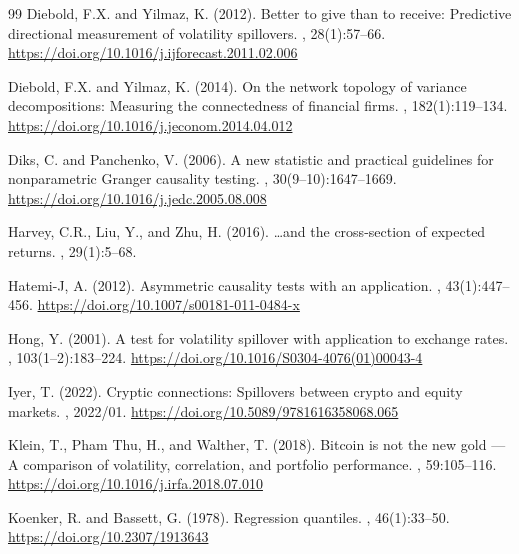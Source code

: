 \documentclass[11pt,a4paper]{article}
\begin{document}
\begin{thebibliography}{99}
Diebold, F.X. and Yilmaz, K. (2012).
\newblock Better to give than to receive: Predictive directional measurement of volatility spillovers.
, 28(1):57--66.
\newblock \url{https://doi.org/10.1016/j.ijforecast.2011.02.006}

Diebold, F.X. and Yilmaz, K. (2014).
\newblock On the network topology of variance decompositions: Measuring the connectedness of financial firms.
, 182(1):119--134.
\newblock \url{https://doi.org/10.1016/j.jeconom.2014.04.012}

Diks, C. and Panchenko, V. (2006).
\newblock A new statistic and practical guidelines for nonparametric Granger causality testing.
, 30(9--10):1647--1669.
\newblock \url{https://doi.org/10.1016/j.jedc.2005.08.008}

Harvey, C.R., Liu, Y., and Zhu, H. (2016).
\newblock \ldots and the cross-section of expected returns.
, 29(1):5--68.

Hatemi-J, A. (2012).
\newblock Asymmetric causality tests with an application.
, 43(1):447--456.
\newblock \url{https://doi.org/10.1007/s00181-011-0484-x}

Hong, Y. (2001).
\newblock A test for volatility spillover with application to exchange rates.
, 103(1--2):183--224.
\newblock \url{https://doi.org/10.1016/S0304-4076(01)00043-4}

Iyer, T. (2022).
\newblock Cryptic connections: Spillovers between crypto and equity markets.
, 2022/01.
\newblock \url{https://doi.org/10.5089/9781616358068.065}

Klein, T., Pham Thu, H., and Walther, T. (2018).
\newblock Bitcoin is not the new gold --- A comparison of volatility, correlation, and portfolio performance.
, 59:105--116.
\newblock \url{https://doi.org/10.1016/j.irfa.2018.07.010}

Koenker, R. and Bassett, G. (1978).
\newblock Regression quantiles.
, 46(1):33--50.
\newblock \url{https://doi.org/10.2307/1913643}


\end{thebibliography}
\end{document}

